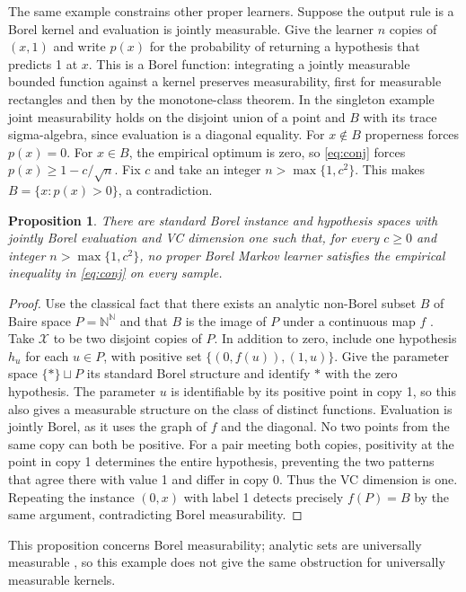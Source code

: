 \documentclass[11pt]{article}
\newtheorem{proposition}[theorem]{Proposition}
\theoremstyle{definition}\newtheorem{definition}[theorem]{Definition}
\newcommand{\XX}{\mathcal X}
\begin{document}
The same example constrains other proper learners. Suppose the output rule
is a Borel kernel and evaluation is jointly measurable. Give the learner $n$ copies of $(x,1)$ and write $p(x)$ for
the probability of returning a hypothesis that predicts 1 at $x$.
This is a Borel function: integrating a jointly measurable bounded
function against a kernel preserves measurability, first for measurable
rectangles and then by the monotone-class theorem. In the singleton
example joint measurability holds on the disjoint union of a point and
$B$ with its trace sigma-algebra, since evaluation is a diagonal equality.
For $x\notin B$ properness forces $p(x)=0$. For $x\in B$, the empirical
optimum is zero, so \eqref{eq:conj} forces $p(x)\ge1-c/\sqrt n$.
Fix $c$ and take an integer $n>\max\{1,c^2\}$. This makes $B=\{x:p(x)>0\}$, a contradiction.

\begin{proposition}
There are standard Borel instance and hypothesis spaces with jointly Borel
evaluation and VC dimension one such that, for every $c\ge0$ and integer
$n>\max\{1,c^2\}$, no proper Borel Markov learner satisfies the empirical
inequality in \eqref{eq:conj} on every sample.
\end{proposition}
\begin{proof}
Use the classical fact
that there exists an analytic non-Borel subset $B$ of Baire space
$P=\mathbb N^{\mathbb N}$ and that $B$ is the image of $P$ under a
continuous map $f$ \cite[Def.~14.1 and Thm.~14.2]{kechris}.
Take $\XX$ to be two disjoint copies of $P$. In addition to zero, include
one hypothesis $h_u$ for each $u\in P$, with positive set
$\{(0,f(u)),(1,u)\}$. Give the parameter space $\{*\}\sqcup P$ its standard Borel structure
and identify $*$ with the zero hypothesis. The parameter $u$ is identifiable
by its positive point in copy 1, so this also gives a measurable structure
on the class of distinct functions. Evaluation is jointly Borel, as it uses the graph of $f$
and the diagonal. No two points from the same copy can both be positive.
For a pair meeting both copies, positivity at the point in copy 1 determines
the entire hypothesis, preventing the two patterns that agree there with
value 1 and differ in copy 0. Thus the VC dimension is one. Repeating
the instance $(0,x)$ with label 1 detects precisely $f(P)=B$ by the same
argument, contradicting Borel measurability.
\end{proof}
This proposition concerns Borel measurability;
analytic sets are universally measurable \cite[Thm.~21.10]{kechris},
so this example does not give the same obstruction for universally measurable kernels.
\end{document}
